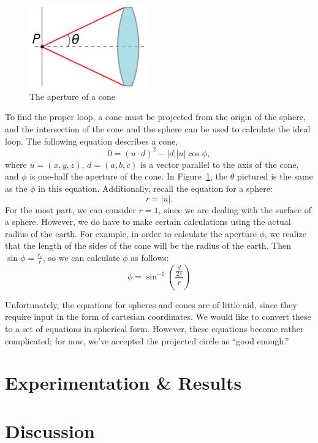 \documentclass[twocolumn,11pt]{article}
\begin{document}
\begin{figure}
  \centering
  \includegraphics[width=2in]{images/220px-Numerical_aperture.png}
  \caption{The aperture of a cone} \label{fig:aperture}
\end{figure}
To find the proper loop, a cone must be projected from the origin of the sphere,
and the intersection of the cone and the sphere can be used to calculate the
ideal loop. The following equation describes a cone,
\[ 0 = (u \cdot d)^2 - |d||u|\cos \phi , \]
where $u= (x,y,z)$, $d = (a,b,c)$ is a vector parallel to the axis of the
cone, and $\phi$ is one-half the aperture of the cone. In
Figure~\ref{fig:aperture}, the $\theta$ pictured is the same as the $\phi$ in
this equation. Additionally, recall
the equation for a sphere:
\[ r = |u|. \]
For the most part, we can consider $r = 1$, since we are dealing with the
surface of a sphere. However, we do have to make certain calculations using
the actual radius of the earth. For example, in order to calculate the
aperture $\phi$, we realize that the length of the sides of the cone will be the
radius of the earth. Then $\sin \phi = \frac{r_c}{r}$, so we can calculate
$\phi$ as follows:
\begin{equation}
  \phi = \sin^{-1} \left( \frac{\frac{d}{2\pi}}{r} \right) \label{eq:phi}
\end{equation}

Unfortunately, the equations for spheres and cones are of little aid, since
they require
input in the form of cartesian coordinates. We would like to convert these to
a set of equations in spherical form. However, these equations become rather
complicated; for now, we've accepted the projected circle as ``good enough.''

\section{Experimentation \& Results}

\section{Discussion}
\end{document}
